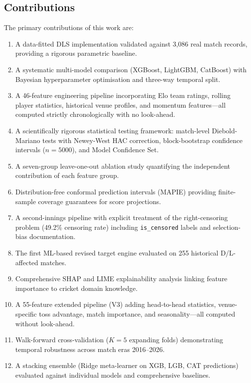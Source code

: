 \documentclass[10pt,a4paper,twocolumn]{article}
\begin{document}
\subsection{Contributions}

The primary contributions of this work are:

\begin{enumerate}[leftmargin=1.2em]
\item A data-fitted DLS implementation validated against 3,086 real match records, providing a rigorous parametric baseline.
\item A systematic multi-model comparison (XGBoost, LightGBM, CatBoost) with Bayesian hyperparameter optimisation and three-way temporal split.
\item A 46-feature engineering pipeline incorporating Elo team ratings, rolling player statistics, historical venue profiles, and momentum features---all computed strictly chronologically with no look-ahead.
\item A scientifically rigorous statistical testing framework: match-level Diebold-Mariano tests with Newey-West HAC correction, block-bootstrap confidence intervals ($n=5000$), and Model Confidence Set.
\item A seven-group leave-one-out ablation study quantifying the independent contribution of each feature group.
\item Distribution-free conformal prediction intervals (MAPIE) providing finite-sample coverage guarantees for score projections.
\item A second-innings pipeline with explicit treatment of the right-censoring problem (49.2\% censoring rate) including \texttt{is\_censored} labels and selection-bias documentation.
\item The first ML-based revised target engine evaluated on 255 historical D/L-affected matches.
\item Comprehensive SHAP and LIME explainability analysis linking feature importance to cricket domain knowledge.
\item A 55-feature extended pipeline (V3) adding head-to-head statistics, venue-specific toss advantage, match importance, and seasonality---all computed without look-ahead.
\item Walk-forward cross-validation ($K=5$ expanding folds) demonstrating temporal robustness across match eras 2016--2026.
\item A stacking ensemble (Ridge meta-learner on XGB, LGB, CAT predictions) evaluated against individual models and comprehensive baselines.

\end{enumerate}
\end{document}
